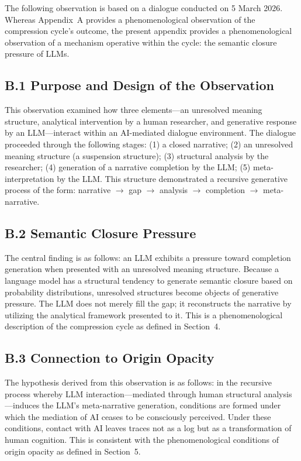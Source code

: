 \documentclass[12pt]{article}
\begin{document}
The following observation is based on a dialogue conducted on 5 March 2026. Whereas Appendix~A provides a phenomenological observation of the compression cycle's outcome, the present appendix provides a phenomenological observation of a mechanism operative within the cycle: the semantic closure pressure of LLMs.

\subsection*{B.1 Purpose and Design of the Observation}

This observation examined how three elements---an unresolved meaning structure, analytical intervention by a human researcher, and generative response by an LLM---interact within an AI-mediated dialogue environment. The dialogue proceeded through the following stages: (1) a closed narrative; (2) an unresolved meaning structure (a suspension structure); (3) structural analysis by the researcher; (4) generation of a narrative completion by the LLM; (5) meta-interpretation by the LLM. This structure demonstrated a recursive generative process of the form: narrative $\rightarrow$ gap $\rightarrow$ analysis $\rightarrow$ completion $\rightarrow$ meta-narrative.

\subsection*{B.2 Semantic Closure Pressure}

The central finding is as follows: an LLM exhibits a pressure toward completion generation when presented with an unresolved meaning structure. Because a language model has a structural tendency to generate semantic closure based on probability distributions, unresolved structures become objects of generative pressure. The LLM does not merely fill the gap; it reconstructs the narrative by utilizing the analytical framework presented to it. This is a phenomenological description of the compression cycle as defined in Section~4.

\subsection*{B.3 Connection to Origin Opacity}

The hypothesis derived from this observation is as follows: in the recursive process whereby LLM interaction---mediated through human structural analysis---induces the LLM's meta-narrative generation, conditions are formed under which the mediation of AI ceases to be consciously perceived. Under these conditions, contact with AI leaves traces not as a log but as a transformation of human cognition. This is consistent with the phenomenological conditions of origin opacity as defined in Section~5.
\end{document}
